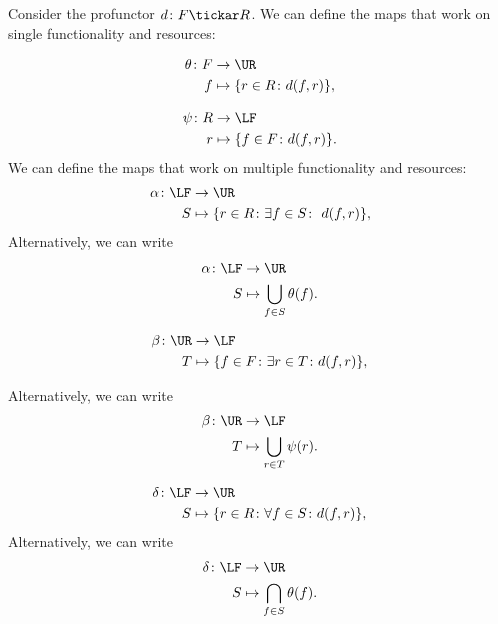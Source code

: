 Consider the profunctor $d\colon F\tickar R$. We can define the maps that work on single functionality and resources:

\begin{equation}
    \begin{aligned}
    \theta\colon F&\to \UR\\
    f&\mapsto \{r\in R \colon d(f, r) \},
    \end{aligned}
\end{equation}

\begin{equation}
    \begin{aligned}
    \psi\colon R&\to \LF\\
    r&\mapsto \{f\in F \colon d(f, r) \}.
    \end{aligned}
\end{equation}
We can define the maps that work on multiple functionality 
and resources:
\begin{equation}
\label{eq:galoisalfa}
    \begin{aligned}
    \alpha\colon \LF&\to \UR\\
    S&\mapsto \{r\in R \colon \exists f\in S\colon \ d(f,r)\},
    \end{aligned}
\end{equation}
Alternatively, we can write 
\begin{equation}
\begin{aligned}
\alpha \colon \LF &\to \UR \\
S&\mapsto \bigcup_{f\in S} \theta(f).
\end{aligned}
\end{equation}

\begin{equation}
\label{eq:galoisbeta}
    \begin{aligned}
    \beta\colon \UR&\to \LF\\
    T&\mapsto \{f\in F  \colon \exists r\in T\colon d(f,r)\},
    \end{aligned}
\end{equation}

\noindent Alternatively, we can write
\begin{equation}
\begin{aligned}
\beta \colon \UR &\to \LF \\
T&\mapsto \bigcup_{r\in T} \psi(r).
\end{aligned}
\end{equation}

\begin{equation}
\label{eq:galoisdelta}
    \begin{aligned}
    \delta \colon \LF&\to \UR\\
    S&\mapsto \{r\in R \colon \forall {f\in S}\colon d(f,r)\},
    \end{aligned}
\end{equation}
Alternatively, we can write
\begin{equation}
    \begin{aligned}
    \delta\colon \LF &\to \UR\\
    S&\mapsto \bigcap_{f\in S}\theta(f).
    \end{aligned}
\end{equation}

